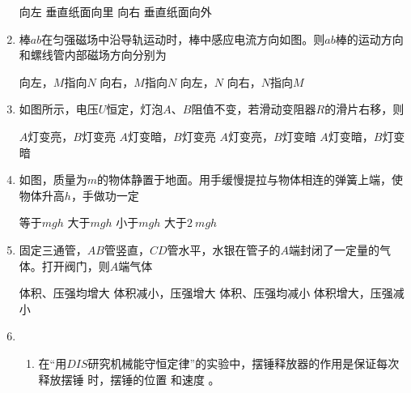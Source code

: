 \begin{enumerate}
\fourchoices
{向左}
{垂直纸面向里}
{向右}
{垂直纸面向外}






\item
棒$ ab $在匀强磁场中沿导轨运动时，棒中感应电流方向如图。则$ ab $棒的运动方向和螺线管内部磁场方向分别为  
\begin{figure}[h!]
	\centering
	
\end{figure}

\fourchoices
{向左，$ M $指向$ N $}
{向右，$ M $指向$ N $}
{向左，$ N $}
{向右，$ N $指向$ M $}



\item 
如图所示，电压$ U $恒定，灯泡$ A $、$ B $阻值不变，若滑动变阻器$ R $的滑片右移，则  
\begin{figure}[h!]
	\centering
	
\end{figure}

\fourchoices
{$ A $灯变亮，$ B $灯变亮}
{$ A $灯变暗，$ B $灯变亮}
{$ A $灯变亮，$ B $灯变暗}
{$ A $灯变暗，$ B $灯变暗}



\item
如图，质量为$ m $的物体静置于地面。用手缓慢提拉与物体相连的弹簧上端，使物体升高$ h $，手做功一定  
\begin{figure}[h!]
	\centering
	
\end{figure}

\fourchoices
{等于$ mgh $}
{大于$ mgh $}
{小于$ mgh $}
{大于$ 2 \ m gh $}




\item
固定三通管，$ AB $管竖直，$ CD $管水平，水银在管子的$ A $端封闭了一定量的气体。打开阀门，则$ A $端气体  
\begin{figure}[h!]
	\centering
	
\end{figure}

\fourchoices
{体积、压强均增大}
{体积减小，压强增大}
{体积、压强均减小}
{体积增大，压强减小}




\gaokaosy




\item
\begin{enumerate}
	\item
在“用$ DIS $研究机械能守恒定律”的实验中，摆锤释放器的作用是保证每次释放摆锤
时，摆锤的位置 \underlinegap 和速度 \underlinegap 。



\end{enumerate}
\end{enumerate}

